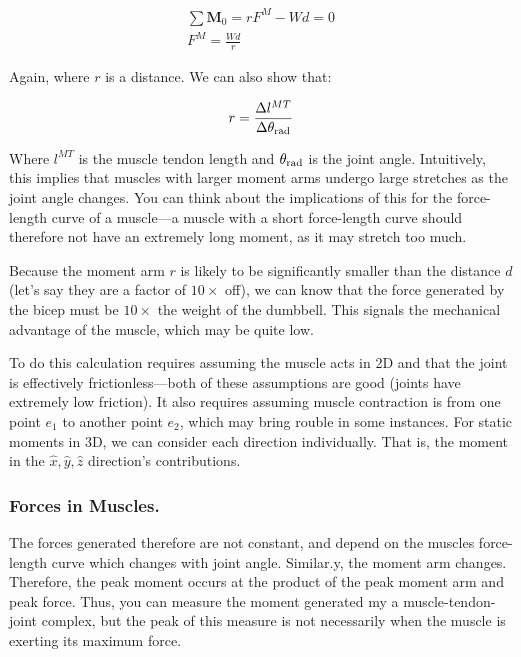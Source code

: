 \begin{equation}
\begin{split}
    \sum \mathbf{M}_0 = rF^M - Wd = 0 \\   
    F^M = \frac{Wd}{r}
\end{split}
\end{equation}

Again, where $r$ is a distance. We can also show that: 

\begin{equation}
\begin{split}
    r = \frac{\Delta l^{MT}}{\Delta \theta_{\rm rad}}
\end{split}
\end{equation}

Where $l^{MT}$ is the muscle tendon length and $\theta_{\rm rad}$ is the joint angle. Intuitively, this implies that muscles with larger moment arms undergo large stretches as the joint angle changes. You can think about the implications of this for the force-length curve of a muscle---a muscle with a short force-length curve should therefore not have an extremely long moment, as it may stretch too much.\newline

Because the moment arm $r$ is likely to be significantly smaller than the distance $d$ (let's say they are a factor of $10\times$ off), we can know that the force generated by the bicep must be $10\times$ the weight of the dumbbell. This signals the mechanical advantage of the muscle, which may be quite low.\newline

To do this calculation requires assuming the muscle acts in 2D and that the joint is effectively frictionless---both of these assumptions are good (joints have extremely low friction). It also requires assuming muscle contraction is from one point $e_1$ to another point $e_2$, which may bring rouble in some instances. For static moments in 3D, we can consider each direction individually. That is, the moment in the $\hat{x}, \hat{y}, \hat{z}$ direction's contributions. 

\subsubsection{Forces in Muscles.}

The forces generated therefore are not constant, and depend on the muscles force-length curve which changes with joint angle. Similar.y, the moment arm changes. Therefore, the peak moment occurs at the product of the peak moment arm and peak force. Thus, you can measure the moment generated my a muscle-tendon-joint complex, but the peak of this measure is not necessarily when the muscle is exerting its maximum force. 


